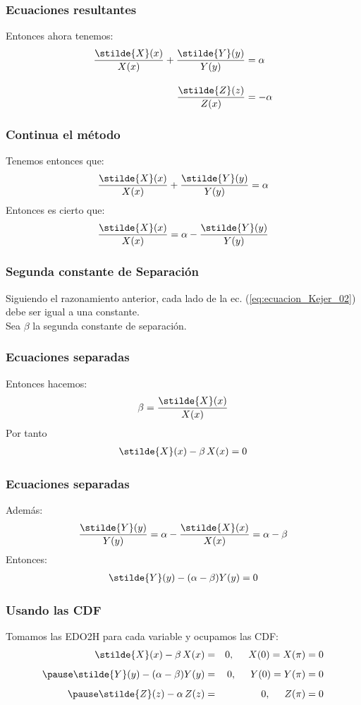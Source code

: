 \begin{frame}
\frametitle{Ecuaciones resultantes}
Entonces ahora tenemos:
\begin{align*}
\dfrac{\stilde{X} (x)}{X(x)} + \dfrac{\stilde{Y} (y)}{Y(y)} &= \alpha \\[1em]
\dfrac{\stilde{Z} (z)}{Z(x)} &= - \alpha
\end{align*}
\end{frame}
\begin{frame}
\frametitle{Continua el método}
Tenemos entonces que:
\begin{align*}
\dfrac{\stilde{X} (x)}{X(x)} + \dfrac{\stilde{Y} (y)}{Y(y)} = \alpha
\end{align*}
\pause
Entonces es cierto que:
\begin{align}
\dfrac{\stilde{X} (x)}{X(x)} = \alpha - \dfrac{\stilde{Y} (y)}{Y(y)}
\label{eq:ecuacion_Kejer_02}
\end{align}
\end{frame}
\begin{frame}
\frametitle{Segunda constante de Separación}
Siguiendo el razonamiento anterior, cada lado de la ec. (\ref{eq:ecuacion_Kejer_02}) debe ser igual a una constante.
\\
\bigskip
\pause
Sea $\beta$ la segunda constante de separación.
\end{frame}
\begin{frame}
\frametitle{Ecuaciones separadas}
Entonces hacemos:
\begin{align*}
\beta = \dfrac{\stilde{X} (x)}{X(x)} 
\end{align*}
\pause
Por tanto
\begin{align*}
\stilde{X} (x) - \beta \, X(x) = 0
\end{align*}
\end{frame}
\begin{frame}
\frametitle{Ecuaciones separadas}
Además:
\begin{align*}
\dfrac{\stilde{Y} (y)}{Y(y)} = \alpha - \dfrac{\stilde{X} (x)}{X(x)} = \alpha - \beta
\end{align*}
\pause
Entonces:
\begin{align*}
\stilde{Y} (y) - (\alpha - \beta) Y(y) = 0
\end{align*}
\end{frame}
\begin{frame}
\frametitle{Usando las CDF}
Tomamos las EDO2H para cada variable y ocupamos las CDF:
\begin{eqnarray}
\stilde{X} (x) - \beta \, X(x) &=& 0, \hspace{0.5cm} X(0) = X(\pi) = 0 \label{eq:ecuacion_Kejer_03} \\[0.5em] \pause
\stilde{Y} (y) - (\alpha - \beta) Y(y) &=& 0, \hspace{0.5cm} Y(0) = Y(\pi) = 0 \label{eq:ecuacion_Kejer_04} \\[0.5em] \pause
\stilde{Z} (z) - \alpha \, Z(z) &=& 0, \hspace{0.5cm} Z(\pi) = 0 \label{eq:ecuacion_Kejer_05}
\end{eqnarray}
\end{frame}

